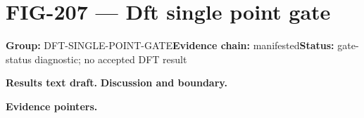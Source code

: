 \clearpage
\section{FIG-207 --- Dft single point gate}
\label{figpage:fig-207}
\textbf{Group:} DFT-SINGLE-POINT-GATE\quad \textbf{Evidence chain:} manifested\quad \textbf{Status:} gate-status diagnostic; no accepted DFT result

\textbf{Results text draft.} 
\textbf{Discussion and boundary.} 


\textbf{Evidence pointers.}



\vfill

